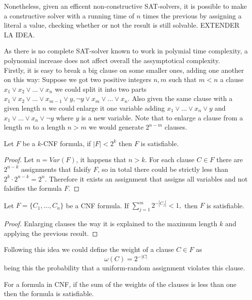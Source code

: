 Nonetheless, given an efficent non-constructive SAT-solvers, it is possible to make a constructive solver with a running time of $n$ times the previous by assigning a literal a value, checking whether or not the result is still solvable. EXTENDER LA IDEA.


As there is no complete SAT-solver known to work in polymial time complexity, a polynomial increase does not affect overall the assymptotical complexity.\\

Firstly, it is easy to break a big clause on some smaller ones, adding one another on this way: Suppose we got two positive integers $n,m$ such that $m < n$ a clause $x_1\vee x_2 \vee ... \vee x_n$ we could split it into two parts $x_1\vee x_2  \vee ... \vee x_{m-1} \vee y, \neg y \vee x_m \vee ... \vee x_n$. Also given the same clause with a given length $n$ we could enlarge it one variable adding $ x_1 \vee ... \vee x_n \vee y$ and $ x_1 \vee ... \vee x_n \vee \neg y$ where $y$ is a new variable. Note that to enlarge a clause from a length $m$ to a length $n>m$ we would generate $2^{n-m}$ clauses.

\begin{proposition}
	Let $F$ be a $k$-CNF formula, if $|F| < 2^k$ then $F$ is satisfiable.
\end{proposition}
\begin{proof}
	Let $n = Var(F)$, it happens that $n > k$. For each clause $C \in F$ there are $2^{n-k}$ assignments that falsify $F$, so in total there could be strictly less than $2^k \cdot 2^{n-k} = 2^n.$ Therefore it exists an assignment that assigns all variables and not falsifies the formula $F$.
\end{proof}
\begin{proposition}
	Let $F=\{C_1,...,C_n\}$ be a CNF formula. If $\sum_{j=1}^m 2^{-|C_j|}<1,$ then $F$ is satisfiable.
\end{proposition}
\begin{proof}
	Enlarging clauses the way it is explained to the maximum length $k$ and applying the previous result.
\end{proof}

Following this idea we could define the weight of a clause $C\in F$ as $$\omega(C) = 2^{-|C|} $$
being this the probability that a uniform-random assignment violates this clause. 

\begin{corollary}
	For a formula in CNF, if the sum of the weights of the clauses is less than one then the formula is satisfiable.
\end{corollary}


